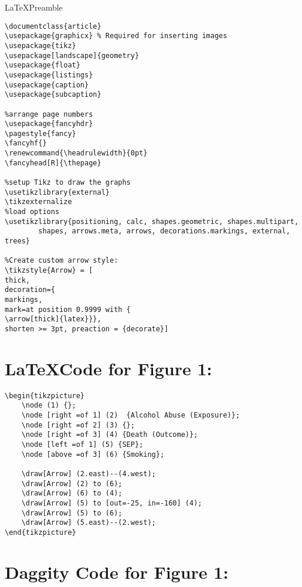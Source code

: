 \documentclass{article}
\renewcommand{\headrulewidth}{0pt}
\begin{document}
\huge \LaTeX \hspace*{5mm }Preamble
\normalsize
\begin{lstlisting}[frame=single, basicstyle=\ttfamily]
    \documentclass{article}
\usepackage{graphicx} % Required for inserting images
\usepackage{tikz}
\usepackage[landscape]{geometry}
\usepackage{float}
\usepackage{listings}
\usepackage{caption}
\usepackage{subcaption}

%arrange page numbers
\usepackage{fancyhdr}
\pagestyle{fancy}
\fancyhf{}
\renewcommand{\headrulewidth}{0pt}
\fancyhead[R]{\thepage}

%setup Tikz to draw the graphs
\usetikzlibrary{external}
\tikzexternalize 
%load options
\usetikzlibrary{positioning, calc, shapes.geometric, shapes.multipart,
        shapes, arrows.meta, arrows, decorations.markings, external, trees}

%Create custom arrow style:
\tikzstyle{Arrow} = [
thick,
decoration={
markings,
mark=at position 0.9999 with {
\arrow[thick]{latex}}},
shorten >= 3pt, preaction = {decorate}]
\end{lstlisting}



\section*{\LaTeX Code for Figure 1:}
\begin{lstlisting}[frame=single, basicstyle=\ttfamily]
\begin{tikzpicture}
    \node (1) {};
    \node [right =of 1] (2)  {Alcohol Abuse (Exposure)};
    \node [right =of 2] (3) {};
    \node [right =of 3] (4) {Death (Outcome)};
    \node [left =of 1] (5) {SEP};
    \node [above =of 3] (6) {Smoking};

    \draw[Arrow] (2.east)--(4.west);
    \draw[Arrow] (2) to (6);
    \draw[Arrow] (6) to (4);
    \draw[Arrow] (5) to [out=-25, in=-160] (4);
    \draw[Arrow] (5) to (6);
    \draw[Arrow] (5.east)--(2.west);
\end{tikzpicture}
\end{lstlisting}

\section*{Daggity Code for Figure 1:}
\begin{lstlisting}[frame=single, basicstyle=\ttfamily]
\end{lstlisting}
    
\end{document}
